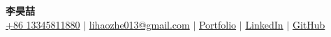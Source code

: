\begin{center}
  \textbf{\Huge 李昊喆} \\ \vspace{4pt}
  \footnotesize \href{tel:+86 13345811880}{\faPhone*\enspace +86 13345811880} $|$
  \href{mailto:lihaozhe013@gmail.com}{\faEnvelope\enspace lihaozhe013@gmail.com} $|$
  \href{https://lihaozhe013.github.io/}{\faBriefcase\enspace Portfolio} $|$
  \href{https://linkedin.com/in/lihaozhe013}{\faLinkedin\enspace LinkedIn} $|$
  \href{https://github.com/lihaozhe013}{\faGithub\enspace GitHub}
\end{center}
